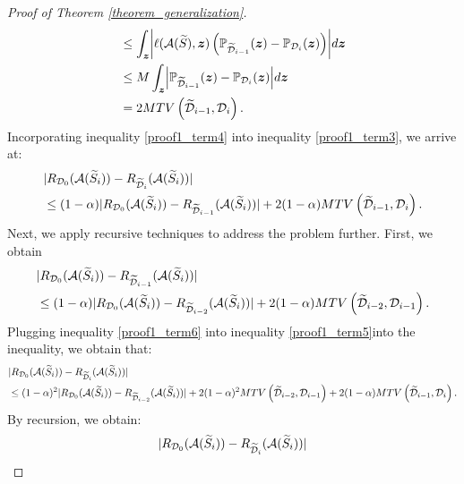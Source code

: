 \begin{proof}[Proof of Theorem \ref{theorem_generalization}]
\begin{align}
&\leq\int_{\boldsymbol{z}}\biggl|\ell(\mathcal{A}(\widetilde{S}),\boldsymbol{z})\left(\mathbb{P}_{\widetilde{\mathcal{D}}_{i-1}}(\boldsymbol{z})-\mathbb{P}_{\mathcal{D}_i}(\boldsymbol{z})\right)\biggr| d\boldsymbol{z} \notag\\
&\leq M\int_{\boldsymbol{z}}\Bigl|\mathbb{P}_{\widetilde{\mathcal{D}}_{i-1}}(\boldsymbol{z})-\mathbb{P}_{\mathcal{D}_i}(\boldsymbol{z})\Bigr| d\boldsymbol{z} \notag\\
&= 2M TV\left(\widetilde{\mathcal{D}}_{i-1},\mathcal{D}_{i}\right).  \label{proof1_term4}
\end{align}
Incorporating inequality \ref{proof1_term4} into inequality \ref{proof1_term3}, we arrive at:
\begin{align}
    &|R_{\mathcal{D}_0}(\mathcal{A}(\widetilde{S}_i))-R_{\widetilde{\mathcal{D}}_i}(\mathcal{A}(\widetilde{S}_i))|\notag \\
    &\leq (1-\alpha)|R_{\mathcal{D}_0}(\mathcal{A}(\widetilde{S}_i))-R_{\widetilde{\mathcal{D}}_{i-1}}(\mathcal{A}(\widetilde{S}_i))|+2(1-\alpha)M TV\left(\widetilde{\mathcal{D}}_{i-1},\mathcal{D}_{i}\right)\label{proof1_term5}.
\end{align}
Next, we apply recursive techniques to address the problem further. First, we obtain
\begin{align}
    &|R_{\mathcal{D}_0}(\mathcal{A}(\widetilde{S}_i))-R_{\widetilde{\mathcal{D}}_{i-1}}(\mathcal{A}(\widetilde{S}_i))|\notag \\
    &\leq (1-\alpha)|R_{\mathcal{D}_0}(\mathcal{A}(\widetilde{S}_i))-R_{\widetilde{\mathcal{D}}_{i-2}}(\mathcal{A}(\widetilde{S}_i))|+2(1-\alpha)M TV\left(\widetilde{\mathcal{D}}_{i-2},\mathcal{D}_{i-1}\right)\label{proof1_term6}.
\end{align}
Plugging inequality \ref{proof1_term6} into inequality \ref{proof1_term5}into the inequality, we obtain that:
\begin{align}
    &|R_{\mathcal{D}_0}(\mathcal{A}(\widetilde{S}_i))-R_{\widetilde{\mathcal{D}}_i}(\mathcal{A}(\widetilde{S}_i))|\notag \\
    &\leq (1-\alpha)^2|R_{\mathcal{D}_0}(\mathcal{A}(\widetilde{S}_i))-R_{\widetilde{\mathcal{D}}_{i-2}}(\mathcal{A}(\widetilde{S}_i))|+2(1-\alpha)^2MTV\left(\widetilde{\mathcal{D}}_{i-2},\mathcal{D}_{i-1}\right)+2(1-\alpha)MTV\left(\widetilde{\mathcal{D}}_{i-1},\mathcal{D}_{i}\right) \notag.
\end{align}
By recursion, we obtain:
\begin{align}
    &|R_{\mathcal{D}_0}(\mathcal{A}(\widetilde{S}_i))-R_{\widetilde{\mathcal{D}}_i}(\mathcal{A}(\widetilde{S}_i))|\notag \\

\end{align}
\end{proof}
